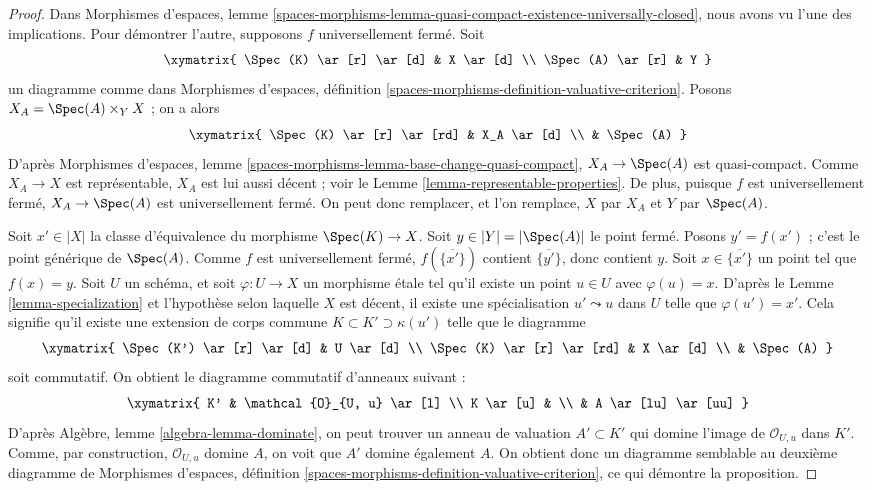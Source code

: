 \begin{proof}
Dans
Morphismes d'espaces,
lemme \ref{spaces-morphisms-lemma-quasi-compact-existence-universally-closed},
nous avons vu l'une des implications.
Pour démontrer l'autre, supposons $f$ universellement fermé. Soit
$$
\xymatrix{
\Spec(K) \ar[r] \ar[d] & X \ar[d] \\
\Spec(A) \ar[r] & Y
}
$$
un diagramme comme dans
Morphismes d'espaces,
définition \ref{spaces-morphisms-definition-valuative-criterion}.
Posons $X_A = \Spec(A) \times_Y X$ ; on a alors
$$
\xymatrix{
\Spec(K) \ar[r] \ar[rd] & X_A \ar[d] \\
 & \Spec(A)
}
$$
D'après
Morphismes d'espaces,
lemme \ref{spaces-morphisms-lemma-base-change-quasi-compact},
$X_A \to \Spec(A)$ est quasi-compact. Comme $X_A \to X$
est représentable, $X_A$ est lui aussi décent ; voir le
Lemme \ref{lemma-representable-properties}.
De plus, puisque $f$ est universellement fermé, $X_A \to \Spec(A)$
est universellement fermé.
On peut donc remplacer, et l'on remplace, $X$ par $X_A$ et $Y$ par $\Spec(A)$.

\medskip\noindent
Soit $x' \in |X|$ la classe d'équivalence du morphisme
$\Spec(K) \to X$. Soit $y \in |Y| = |\Spec(A)|$
le point fermé. Posons $y' = f(x')$ ; c'est le point générique de
$\Spec(A)$. Comme $f$ est universellement fermé,
$f(\overline{\{x'\}})$ contient $\overline{\{y'\}}$, donc
contient $y$. Soit $x \in \overline{\{x'\}}$ un point tel que
$f(x) = y$. Soit $U$ un schéma, et soit $\varphi : U \to X$
un morphisme étale tel qu'il existe un point $u \in U$ avec
$\varphi(u) = x$. D'après le
Lemme \ref{lemma-specialization}
et l'hypothèse selon laquelle $X$ est décent,
il existe une spécialisation $u' \leadsto u$ dans $U$ telle que
$\varphi(u') = x'$.
Cela signifie qu'il existe une extension de corps commune
$K \subset K' \supset \kappa(u')$ telle que le diagramme
$$
\xymatrix{
\Spec(K') \ar[r] \ar[d] & U \ar[d] \\
\Spec(K) \ar[r] \ar[rd] & X \ar[d] \\
 & \Spec(A)
}
$$
soit commutatif. On obtient le diagramme commutatif d'anneaux suivant :
$$
\xymatrix{
K' & \mathcal{O}_{U, u} \ar[l] \\
K \ar[u] & \\
 & A \ar[lu] \ar[uu]
}
$$
D'après
Algèbre, lemme \ref{algebra-lemma-dominate},
on peut trouver un anneau de valuation $A' \subset K'$ qui domine l'image de
$\mathcal{O}_{U, u}$ dans $K'$. Comme, par construction, $\mathcal{O}_{U, u}$
domine $A$, on voit que $A'$ domine également $A$. On obtient donc un
diagramme
semblable au deuxième diagramme de
Morphismes d'espaces,
définition \ref{spaces-morphisms-definition-valuative-criterion},
ce qui démontre la proposition.
\end{proof}







